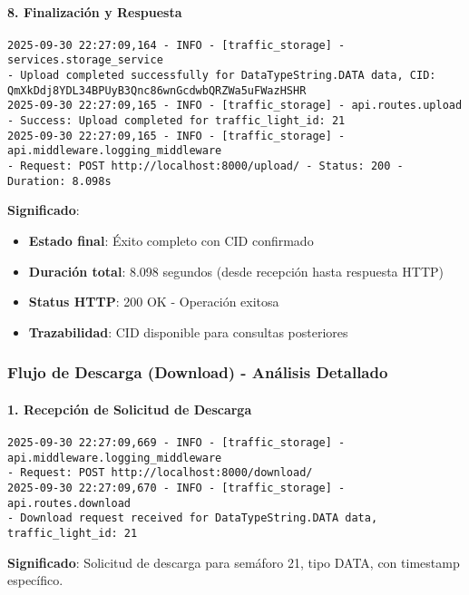 \documentclass[onecolumn]{article}
\begin{document}
\paragraph{8. Finalización y Respuesta}
\begin{verbatim}
2025-09-30 22:27:09,164 - INFO - [traffic_storage] - services.storage_service 
- Upload completed successfully for DataTypeString.DATA data, CID: QmXkDdj8YDL34BPUyB3Qnc86wnGcdwbQRZWa5uFWazHSHR
2025-09-30 22:27:09,165 - INFO - [traffic_storage] - api.routes.upload 
- Success: Upload completed for traffic_light_id: 21
2025-09-30 22:27:09,165 - INFO - [traffic_storage] - api.middleware.logging_middleware 
- Request: POST http://localhost:8000/upload/ - Status: 200 - Duration: 8.098s
\end{verbatim}
\textbf{Significado}:
\begin{itemize}
    \item \textbf{Estado final}: Éxito completo con CID confirmado
    \item \textbf{Duración total}: 8.098 segundos (desde recepción hasta respuesta HTTP)
    \item \textbf{Status HTTP}: 200 OK - Operación exitosa
    \item \textbf{Trazabilidad}: CID disponible para consultas posteriores
\end{itemize}

\subsubsection{Flujo de Descarga (Download) - Análisis Detallado}

\paragraph{1. Recepción de Solicitud de Descarga}
\begin{verbatim}
2025-09-30 22:27:09,669 - INFO - [traffic_storage] - api.middleware.logging_middleware 
- Request: POST http://localhost:8000/download/
2025-09-30 22:27:09,670 - INFO - [traffic_storage] - api.routes.download 
- Download request received for DataTypeString.DATA data, traffic_light_id: 21
\end{verbatim}
\textbf{Significado}: Solicitud de descarga para semáforo 21, tipo DATA, con timestamp específico.
\end{document}
